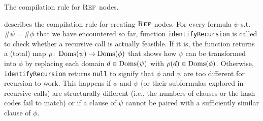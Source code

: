 \begin{algorithm}[t]
  \caption{The compilation rule for $\operatorname{\textsc{Ref}}$ nodes.}\label{alg:trycache}

  \Return{$\emptyset$}\;



\end{algorithm}

 describes the compilation rule for creating $\operatorname{\textsc{Ref}}$ nodes.
For every formula $\psi$ s.t. $\#\psi = \#\phi$ that we have encountered so far,
function \texttt{identifyRecursion} is called to check whether a recursive call
is actually feasible. If it is, the function returns a (total) map
$\rho\colon \operatorname{Doms}(\psi) \to \operatorname{Doms}(\phi)$ that shows how $\psi$ can be
transformed into $\phi$ by replacing each domain $d \in \operatorname{Doms}(\psi)$ with
$\rho(d) \in \operatorname{Doms}(\phi)$. Otherwise, \texttt{identifyRecursion} returns
\texttt{null} to signify that $\phi$ and $\psi$ are too different for recursion
to work. This happens if $\phi$ and $\psi$ (or their subformulas explored in
recursive calls) are structurally different (i.e., the numbers of clauses or the
hash codes fail to match) or if a clause of $\psi$ cannot be paired with a
sufficiently similar clause of $\phi$.

